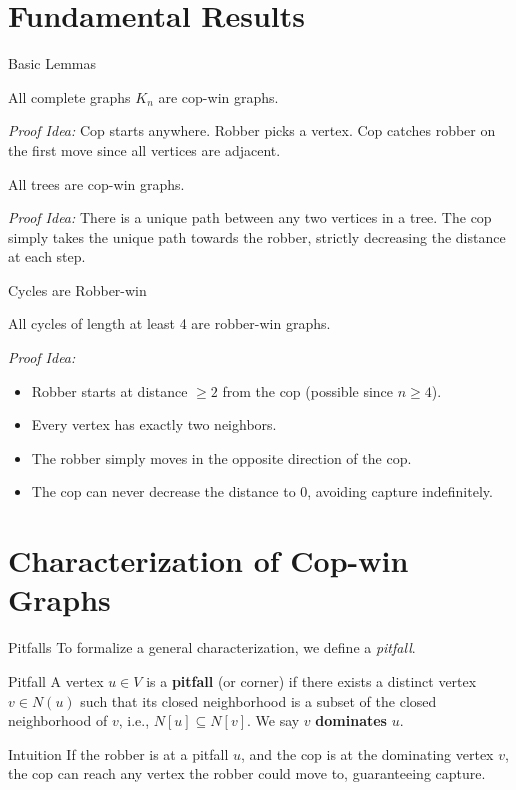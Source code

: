 \documentclass[10pt, aspectratio=169]{beamer}
\begin{document}
\section{Fundamental Results}

\begin{frame}{Basic Lemmas}
    \begin{lemma}
        All complete graphs $K_n$ are cop-win graphs.
    \end{lemma}
    \textit{Proof Idea:} Cop starts anywhere. Robber picks a vertex. Cop catches robber on the first move since all vertices are adjacent.
    
    \vspace{0.5cm}
    \begin{lemma}
        All trees are cop-win graphs.
    \end{lemma}
    \textit{Proof Idea:} There is a unique path between any two vertices in a tree. The cop simply takes the unique path towards the robber, strictly decreasing the distance at each step.
\end{frame}

\begin{frame}{Cycles are Robber-win}
    \begin{lemma}
        All cycles of length at least 4 are robber-win graphs.
    \end{lemma}
    \textit{Proof Idea:}
    \begin{itemize}
        \item Robber starts at distance $\ge 2$ from the cop (possible since $n \ge 4$).
        \item Every vertex has exactly two neighbors.
        \item The robber simply moves in the opposite direction of the cop.
        \item The cop can never decrease the distance to $0$, avoiding capture indefinitely.
    \end{itemize}
\end{frame}

\section{Characterization of Cop-win Graphs}

\begin{frame}{Pitfalls}
    To formalize a general characterization, we define a \textit{pitfall}.
    \begin{alertblock}{Pitfall}
        A vertex $u \in V$ is a \textbf{pitfall} (or corner) if there exists a distinct vertex $v \in N(u)$ such that its closed neighborhood is a subset of the closed neighborhood of $v$, i.e., $N[u] \subseteq N[v]$. We say $v$ \textbf{dominates} $u$.
    \end{alertblock}
    \begin{block}{Intuition}
        If the robber is at a pitfall $u$, and the cop is at the dominating vertex $v$, the cop can reach any vertex the robber could move to, guaranteeing capture.
    \end{block}
\end{frame}
\end{document}
